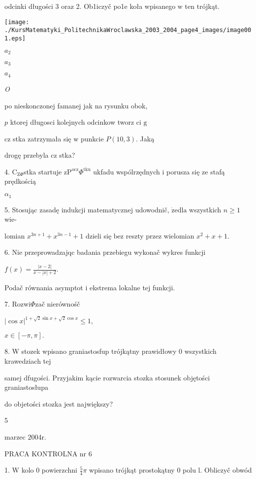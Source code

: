 \documentclass[a4paper,12pt]{article}
\begin{document}
odcinki długości 3 oraz 2. Ob1iczyč po1e koła wpisanego $\mathrm{w}$ ten trójkąt.
\begin{center}
\texttt{[image: ./KursMatematyki\_PolitechnikaWroclawska\_2003\_2004\_page4\_images/image001.eps]}
\end{center}
$a_{2}$

$a_{3}$

$a_{4}$

{\it O}

po nieskonczonej famanej jak na rysunku obok,

$p$ ktorej długosci kolejnych odcinkow tworz ci $\mathrm{g}$

cz stka zatrzymała się $\mathrm{w}$ punkcie $P(10,3)$. Jaką

drogę przebyla cz stka?

4. $\mathrm{C}_{\mathrm{Z}\Phi}$stka startuje $\mathrm{z}\mathrm{P}^{\mathrm{o}\mathrm{c}\mathrm{z}}\Phi^{\mathrm{t}\mathrm{k}\mathrm{u}}$ ukfadu wspólrzędnych $\mathrm{i}$ porusza się ze stafą prędkością

$\alpha_{1}$

5. Stosując zasadę indukcji matematycznej udowodnič, $\dot{\mathrm{z}}\mathrm{e}\mathrm{d}\mathrm{l}\mathrm{a}$ wszystkich $n\geq 1$ wie-

lomian $x^{3n+1}+x^{3n-1}+1$ dzieli się $\mathrm{b}\mathrm{e}\mathrm{z}$ reszty przez wielomian $x^{2}+x+1.$

6. Nie przeprowadzajqc badania przebiegu wykonač wykres funkcji

$f(x)=\displaystyle \frac{|x-2|}{x-|x|+2}.$

Podač równania asymptot i ekstrema lokalne tej funkcji.

7. Rozwi$\Phi$zač nierównośč

$|\cos x|^{1+\sqrt{2}\sin x+\sqrt{2}\cos x}\leq 1,$

$x\in[-\pi,\pi].$

8. W stozek wpisano graniastosfup trójkątny prawidłowy 0 wszystkich krawedziach tej

samej dfugości. Przyjakim kącie rozwarcia stozka stosunek objętości graniastosłupa

do objetości stozka jest największy?

5





marzec 2004r.

PRACA KONTROLNA nr 6

1. $\mathrm{W}$ kolo $0$ powierzchni $\displaystyle \frac{5}{4}\pi$ wpisano trójkąt prostokątny $0$ polu l. Obliczyč obwód
\end{document}
